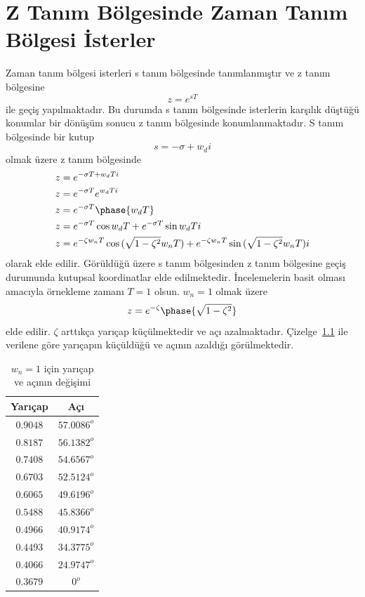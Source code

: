 \chapter{Z Tanım Bölgesinde Zaman Tanım Bölgesi İsterler}
Zaman tanım bölgesi isterleri s tanım bölgesinde tanımlanmıştır ve z tanım bölgesine 
\begin{equation}
    z=e^{sT}
\end{equation}
ile geçiş yapılmaktadır. Bu durumda s tanım bölgesinde isterlerin karşılık düştüğü konumlar bir dönüşüm sonucu z tanım bölgesinde konumlanmaktadır. S tanım bölgesinde bir kutup
\begin{equation}
    s=-\sigma+w_di
\end{equation}
olmak üzere z tanım bölgesinde
\begin{equation}
\begin{split}
    z&=e^{-\sigma T+w_dTi}\\
    z&=e^{-\sigma T}e^{w_dTi}\\
    z&=e^{-\sigma T}\phase{w_dT}\\
    z&=e^{-\sigma T}\cos{w_dT}+e^{-\sigma T}\sin{w_dT}i\\
    z&=e^{-\zeta w_n T}\cos{(\sqrt{1-\zeta^2}w_nT)}+e^{-\zeta w_n T}\sin{(\sqrt{1-\zeta^2}w_nT)}i
\end{split}
\end{equation}
olarak elde edilir. Görüldüğü üzere s tanım bölgesinden z tanım bölgesine geçiş durumunda kutupsal koordinatlar elde edilmektedir. İncelemelerin basit olması amacıyla örnekleme zamanı $T=1$ olsun.
$w_n=1$ olmak üzere
\begin{equation}
        z=e^{-\zeta}\phase{\sqrt{1-\zeta^2}}
\end{equation}
elde edilir. $\zeta$ arttıkça yarıçap küçülmektedir ve açı azalmaktadır. Çizelge~\ref{tbl:yaricap_aci1} ile verilene göre yarıçapın küçüldüğü ve açının azaldığı görülmektedir.
\begin{table}[!htb]
    \centering
    \caption{$w_n=1$ için yarıçap ve açının değişimi}\label{tbl:yaricap_aci1}
    \begin{tabular}{cc}\hline
        Yarıçap& Açı\\\hline
        $0.9048$& $57.0086^o$\\
        $0.8187$& $56.1382^o$\\
        $0.7408$& $54.6567^o$\\
        $0.6703$& $52.5124^o$\\
        $0.6065$& $49.6196^o$\\
        $0.5488$& $45.8366^o$\\
        $0.4966$& $40.9174^o$\\
        $0.4493$& $34.3775^o$\\
        $0.4066$& $24.9747^o$\\
        $0.3679$& $0^o$\\\hline
    \end{tabular}
\end{table}

